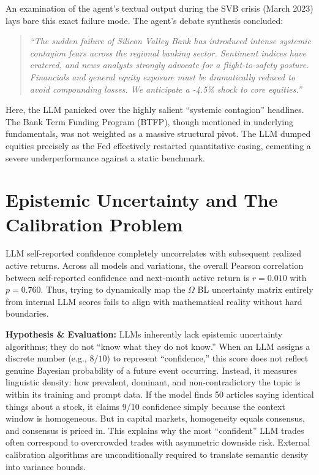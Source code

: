 \documentclass[12pt]{report}
\begin{document}
An examination of the agent's textual output during the SVB crisis (March 2023) lays bare this exact failure mode. The agent's debate synthesis concluded:
\begin{quote}
    \textit{``The sudden failure of Silicon Valley Bank has introduced intense systemic contagion fears across the regional banking sector. Sentiment indices have cratered, and news analysts strongly advocate for a flight-to-safety posture. Financials and general equity exposure must be dramatically reduced to avoid compounding losses. We anticipate a -4.5\% shock to core equities.''}
\end{quote}
Here, the LLM panicked over the highly salient ``systemic contagion'' headlines. The Bank Term Funding Program (BTFP), though mentioned in underlying fundamentals, was not weighted as a massive structural pivot. The LLM dumped equities precisely as the Fed effectively restarted quantitative easing, cementing a severe underperformance against a static benchmark.

\section{Epistemic Uncertainty and The Calibration Problem}
LLM self-reported confidence completely uncorrelates with subsequent realized active returns.
Across all models and variations, the overall Pearson correlation between self-reported confidence and next-month active return is $r=0.010$ with $p=0.760$.
Thus, trying to dynamically map the $\Omega$ BL uncertainty matrix entirely from internal LLM scores fails to align with mathematical reality without hard boundaries.

\textbf{Hypothesis \& Evaluation:} LLMs inherently lack epistemic uncertainty algorithms; they do not ``know what they do not know.''
When an LLM assigns a discrete number (e.g., $8/10$) to represent ``confidence,'' this score does not reflect genuine Bayesian probability of a future event occurring. Instead, it measures linguistic density: how prevalent, dominant, and non-contradictory the topic is within its training and prompt data. If the model finds 50 articles saying identical things about a stock, it claims 9/10 confidence simply because the context window is homogeneous. But in capital markets, homogeneity equals consensus, and consensus is priced in. This explains why the most ``confident'' LLM trades often correspond to overcrowded trades with asymmetric downside risk. External calibration algorithms are unconditionally required to translate semantic density into variance bounds.
\end{document}
